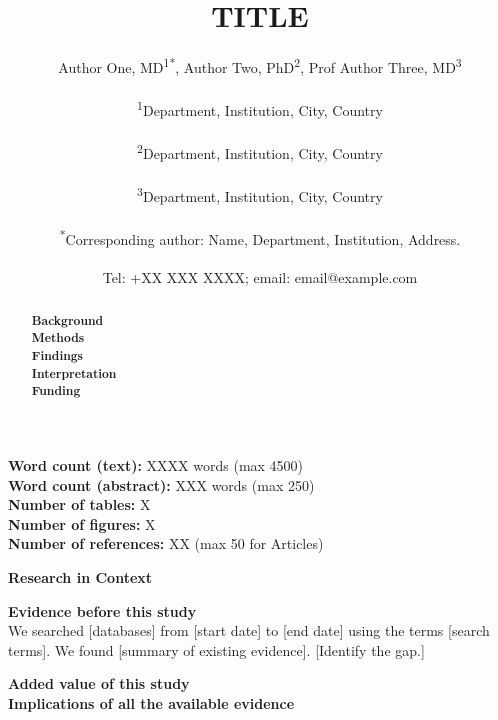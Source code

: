 \documentclass[12pt,a4paper]{article}
\title{\textbf{TITLE}}
\author{
  Author One, MD\textsuperscript{1}\textsuperscript{*},
  Author Two, PhD\textsuperscript{2},
  Prof Author Three, MD\textsuperscript{3} \\\\
  \small\textsuperscript{1}Department, Institution, City, Country \\\\
  \small\textsuperscript{2}Department, Institution, City, Country \\\\
  \small\textsuperscript{3}Department, Institution, City, Country \\\\
  \small\textsuperscript{*}Corresponding author: Name, Department, Institution, Address. \\\\
  \small Tel: +XX XXX XXXX; email: email@example.com
}
\date{}
\begin{document}
\maketitle

\noindent\textbf{Word count (text):} XXXX words (max 4500) \\
\textbf{Word count (abstract):} XXX words (max 250) \\
\textbf{Number of tables:} X \\
\textbf{Number of figures:} X \\
\textbf{Number of references:} XX (max 50 for Articles)

\newpage

\begin{abstract}
\noindent\textbf{Background} \\[0.5em]
\textbf{Methods} \\[0.5em]
\textbf{Findings} \\[0.5em]
\textbf{Interpretation} \\[0.5em]
\textbf{Funding}
\end{abstract}

\newpage

\begin{framed}
\noindent\textbf{Research in Context}

\textbf{Evidence before this study} \\
We searched [databases] from [start date] to [end date] using the terms [search terms]. We found [summary of existing evidence]. [Identify the gap.]

\textbf{Added value of this study} \\
[2--3 sentences describing what this study adds to the evidence base. Be specific about novelty.]

\textbf{Implications of all the available evidence} \\
[2--3 sentences on what the totality of evidence means for clinical practice, policy, or future research.]
\end{framed}

\newpage

\end{document}
